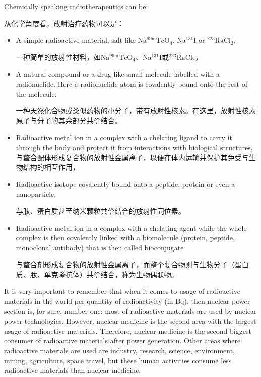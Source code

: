 \documentclass[dvipsnames, svgnames,a4paper,11pt]{article}
\begin{document}
Chemically speaking radiotherapeutics can be:

从化学角度看，放射治疗药物可以是：

\begin{itemize}
      \item A simple radioactive material, salt like Na${}^\text{99m}\text{TcO}_4$, Na${}^\text{131}\text{I}$ or ${}^\text{223}\text{RaCl}_2$,

            一种简单的放射性材料，如Na${}^\text{99m}\text{TcO}_4$、Na${}^\text{131}\text{I}$或${}^\text{223}\text{RaCl}_2$，
      \item A natural compound or a drug-like small molecule labelled with a radionuclide. Here a radionuclide atom is covalently bound onto the rest of the molecule.

            一种天然化合物或类似药物的小分子，带有放射性核素。在这里，放射性核素原子与分子的其余部分共价结合。

      \item Radioactive metal ion in a complex with a chelating ligand to carry it through the body and protect it from interactions with biological structures,
            与螯合配体形成复合物的放射性金属离子，以便在体内运输并保护其免受与生物结构的相互作用，
      \item Radioactive isotope covalently bound onto a peptide, protein or even a nanoparticle.

            与肽、蛋白质甚至纳米颗粒共价结合的放射性同位素。
      \item Radioactive metal ion in a complex with a chelating agent while the whole complex is then covalently linked with a biomolecule (protein, peptide, monoclonal antibody) that is then called bioconjugate

            与螯合剂形成复合物的放射性金属离子，而整个复合物则与生物分子（蛋白质、肽、单克隆抗体）共价结合，称为生物偶联物。
\end{itemize}

It is very important to remember that when it comes to usage of radioactive materials in the world per quantity of radioactivity (in Bq), then nuclear power section is, for sure, number one: most of radioactive materials are used by nuclear power technologies.
However, nuclear medicine is the second area with the largest usage of radioactive materials. Therefore, nuclear medicine is the second biggest consumer of radioactive materials after power generation.
Other areas where radioactive materials are used are industry, research, science, environment, mining, agriculture, space travel, but these human activities consume less radioactive materials than nuclear medicine.
\end{document}
